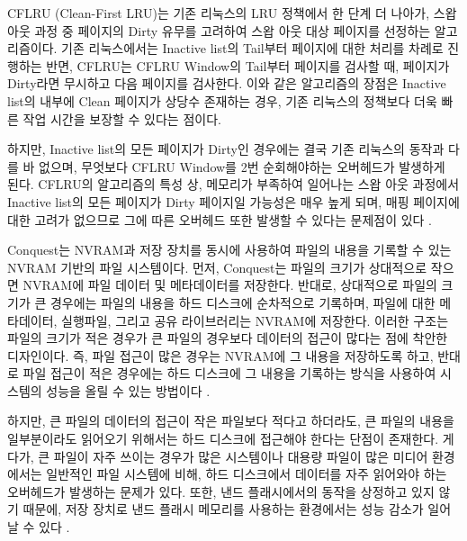 \documentclass[letterpaper,twocolumn,10pt]{article}
\begin{document}
CFLRU (Clean-First LRU)는 기존 리눅스의 LRU 정책에서 한 단계 더 나아가, 스왑 아웃 과정 중 페이지의 Dirty 유무를 고려하여 스왑 아웃 대상 페이지를 선정하는 알고리즘이다. 기존 리눅스에서는 Inactive list의 Tail부터 페이지에 대한 처리를 차례로 진행하는 반면, CFLRU는 CFLRU Window의 Tail부터 페이지를 검사할 때, 페이지가 Dirty라면 무시하고 다음 페이지를 검사한다. 이와 같은 알고리즘의 장점은 Inactive list의 내부에 Clean 페이지가 상당수 존재하는 경우, 기존 리눅스의 정책보다 더욱 빠른 작업 시간을 보장할 수 있다는 점이다.

하지만, Inactive list의 모든 페이지가 Dirty인 경우에는 결국 기존 리눅스의 동작과 다를 바 없으며, 무엇보다 CFLRU Window를 2번 순회해야하는 오버헤드가 발생하게 된다. CFLRU의 알고리즘의 특성 상, 메모리가 부족하여 일어나는 스왑 아웃 과정에서 Inactive list의 모든 페이지가 Dirty 페이지일 가능성은 매우 높게 되며, 매핑 페이지에 대한 고려가 없으므로 그에 따른 오버헤드 또한 발생할 수 있다는 문제점이 있다 \cite{park2006cflru}. 

Conquest는 NVRAM과 저장 장치를 동시에 사용하여 파일의 내용을 기록할 수 있는 NVRAM 기반의 파일 시스템이다. 먼저, Conquest는 파일의 크기가 상대적으로 작으면 NVRAM에 파일 데이터 및 메타데이터를 저장한다. 반대로, 상대적으로 파일의 크기가 큰 경우에는 파일의 내용을 하드 디스크에 순차적으로 기록하며, 파일에 대한 메타데이터, 실행파일, 그리고 공유 라이브러리는 NVRAM에 저장한다. 이러한 구조는 파일의 크기가 적은 경우가 큰 파일의 경우보다 데이터의 접근이 많다는 점에 착안한 디자인이다. 즉, 파일 접근이 많은 경우는 NVRAM에 그 내용을 저장하도록 하고, 반대로 파일 접근이 적은 경우에는 하드 디스크에 그 내용을 기록하는 방식을 사용하여 시스템의 성능을 올릴 수 있는 방법이다 \cite{wang2002conquest}.  

하지만, 큰 파일의 데이터의 접근이 작은 파일보다 적다고 하더라도, 큰 파일의 내용을 일부분이라도 읽어오기 위해서는 하드 디스크에 접근해야 한다는 단점이 존재한다. 게다가, 큰 파일이 자주 쓰이는 경우가 많은 시스템이나 대용량 파일이 많은 미디어 환경에서는 일반적인 파일 시스템에 비해, 하드 디스크에서 데이터를 자주 읽어와야 하는 오버헤드가 발생하는 문제가 있다. 또한, 낸드 플래시에서의 동작을 상정하고 있지 않기 때문에, 저장 장치로 낸드 플래시 메모리를 사용하는 환경에서는 성능 감소가 일어날 수 있다 \cite{huang2014tridentfs}.
\end{document}
